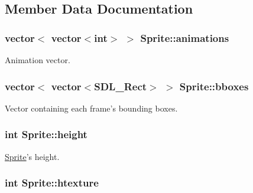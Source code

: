 \subsection{Member Data Documentation}
\hypertarget{class_sprite_a53b4aa1ae4e205df76c5145934fd7c8f}{
\subsubsection[{animations}]{\setlength{\rightskip}{0pt plus 5cm}vector$<$ vector$<$int$>$ $>$ Sprite\-::animations\hspace{0.3cm}{\ttfamily [protected]}}}\label{class_sprite_a53b4aa1ae4e205df76c5145934fd7c8f}


Animation vector. 

\hypertarget{class_sprite_ad18e21f70d9bc3d1e52d2d4c25645e15}{
\subsubsection[{bboxes}]{\setlength{\rightskip}{0pt plus 5cm}vector$<$ vector$<$S\-D\-L\-\_\-\-Rect$>$ $>$ Sprite\-::bboxes\hspace{0.3cm}{\ttfamily [protected]}}}\label{class_sprite_ad18e21f70d9bc3d1e52d2d4c25645e15}


Vector containing each frame's bounding boxes. 

\hypertarget{class_sprite_a1f07c8f2080c193759aec0e13503d7ab}{
\subsubsection[{height}]{\setlength{\rightskip}{0pt plus 5cm}int Sprite\-::height\hspace{0.3cm}{\ttfamily [protected]}}}\label{class_sprite_a1f07c8f2080c193759aec0e13503d7ab}


\hyperlink{class_sprite}{Sprite}'s height. 

\hypertarget{class_sprite_afa90435f9d50265180a80399fda091d1}{
\subsubsection[{htexture}]{\setlength{\rightskip}{0pt plus 5cm}int Sprite\-::htexture\hspace{0.3cm}{\ttfamily [protected]}}}\label{class_sprite_afa90435f9d50265180a80399fda091d1}


